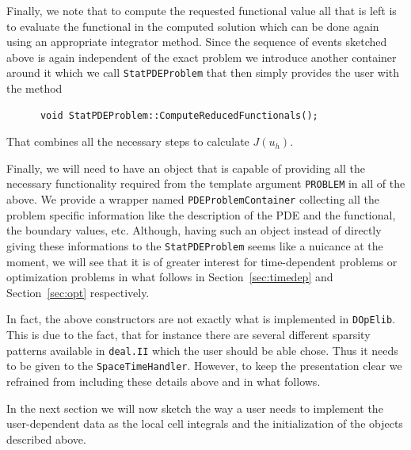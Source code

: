 \documentclass[prodmode,acmtoms]{acmsmall}
\numberwithin{equation}{section}
\newcommand{\deal}{\texttt{deal.II}}
\newcommand{\dope}{\texttt{DOpElib}}
\begin{document}
Finally, we note that to compute the requested functional value 
all that is left is to evaluate the functional in the computed solution 
which can be done again using an appropriate integrator method.
Since the sequence of events sketched above is again independent of the 
exact problem we introduce another container around it which we call 
\texttt{StatPDEProblem} that then simply provides the user with the 
method
\begin{lstlisting}
      void StatPDEProblem::ComputeReducedFunctionals();
\end{lstlisting}
That combines all the necessary steps to calculate $J(u_h)$. 

Finally, we will need to have an object that is capable of providing all 
the necessary functionality required from the template argument 
\texttt{PROBLEM} in all of the above. We provide a wrapper named
\texttt{PDEProblemContainer} collecting all the problem specific information 
like the description of the PDE and the functional, the boundary values, etc. 
Although, having such an object instead of directly giving these informations
to the \texttt{StatPDEProblem} seems like a nuicance at the moment, we will 
see that it is of greater interest for time-dependent problems or 
optimization problems in what follows in Section~\ref{sec:timedep} and
Section~\ref{sec:opt} respectively. 

\begin{remark}
In fact, the above constructors are not exactly what is implemented in \dope{}.
This is due to the fact, that for instance 
there are several different sparsity patterns available in 
\deal{} which the user should be able chose. Thus it needs to be 
given to the \texttt{SpaceTimeHandler}. However, to keep the 
presentation clear we refrained from including these details above and in
what follows.
\end{remark} 

In the next section we will now sketch the way a user needs to implement the
user-dependent data as the local cell integrals and the initialization of the
objects described above.
\end{document}
